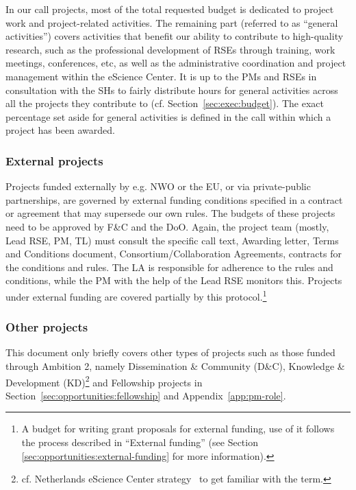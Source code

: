 \documentclass[11pt]{article}
\begin{document}
In our call projects, most of the total requested budget is dedicated to project work and project-related activities.
The remaining part (referred to as “general activities”) covers activities that benefit our ability to contribute to
high-quality research, such as the professional development of RSEs through training, work meetings, conferences, etc,
as well as the administrative coordination and project management within the eScience Center. It is up to the PMs and
RSEs in consultation with the SHs to fairly distribute hours for general activities across all the projects they
contribute to (cf. Section~\ref{sec:exec:budget}). The exact percentage set aside for general activities is defined in
the call within which a project has been awarded.

\subsubsection{External projects}

Projects funded externally by e.g. NWO or the EU, or via private-public partnerships, are governed by external funding
conditions specified in a contract or agreement that may supersede our own rules. The budgets of these projects need to
be approved by F\&C and the DoO. Again, the project team (mostly, Lead RSE, PM, TL) must consult the specific call
text, Awarding letter, Terms and Conditions document, Consortium/Collaboration Agreements, contracts for the conditions
and rules. The LA is responsible for adherence to the rules and conditions, while the PM with the help of the Lead RSE
monitors this. Projects under external funding are covered partially by this protocol.\footnote{A budget for writing
grant proposals for external funding, use of it follows the process described in “External funding” (see Section
\ref{sec:opportunities:external-funding} for more information).}

\subsubsection{Other projects}

This document only briefly covers other types of projects such as those funded through Ambition 2, namely Dissemination
\& Community (D\&C), Knowledge \& Development (KD)\footnote{cf. Netherlands eScience Center strategy~\cite{nlesc-strategy} to get familiar with the term.} and Fellowship projects in 
Section~\ref{sec:opportunities:fellowship} and Appendix~\ref{app:pm-role}.
\end{document}
